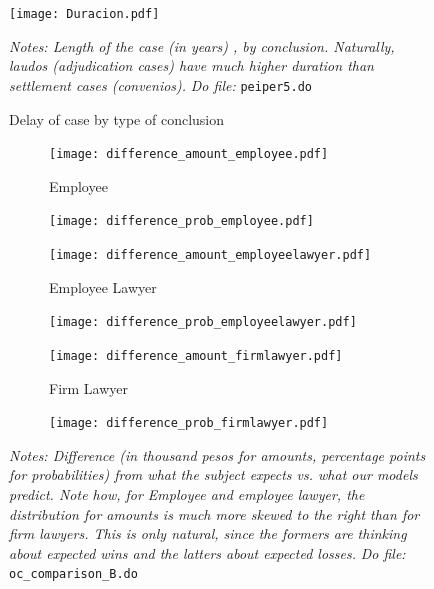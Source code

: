 \documentclass[11pt]{article}
\begin{document}
  
\begin{figure}[H]
    \caption{Delay of case by type of conclusion}
    \label{DurationFig}
    \begin{center}
        \texttt{[image: Duracion.pdf]}
        \end{center}
    {\footnotesize \textit{Notes: Length of the case (in years) , by conclusion. Naturally, laudos (adjudication cases) have much higher duration than settlement cases (convenios).}}
    {\footnotesize \textit{Do file: } \texttt{peiper5.do}}
\end{figure}



\begin{figure}[H]
    \caption{Difference in what actor says and calculator predicts in amount and probability.}
    \label{Figure_overconfidence_exp}
    \begin{center}
    \begin{subfigure}{0.49\textwidth}
        \caption{Employee}
        \centering
        \texttt{[image: difference\_amount\_employee.pdf]}
    \end{subfigure}
     \begin{subfigure}{0.49\textwidth}
        \centering
        \texttt{[image: difference\_prob\_employee.pdf]}
    \end{subfigure}
    \begin{subfigure}{0.49\textwidth}
        \caption{Employee Lawyer}
        \centering
        \texttt{[image: difference\_amount\_employeelawyer.pdf]}
        \end{subfigure}
          \begin{subfigure}{0.49\textwidth}
        \centering
        \texttt{[image: difference\_prob\_employeelawyer.pdf]}
    \end{subfigure}
        \begin{subfigure}{0.49\textwidth}
            \caption{Firm Lawyer}
            \centering
            \texttt{[image: difference\_amount\_firmlawyer.pdf]}
    \end{subfigure}
    \begin{subfigure}{0.49\textwidth}
            \centering
            \texttt{[image: difference\_prob\_firmlawyer.pdf]}
        \end{subfigure}
    \end{center}
     \footnotesize \textit{Notes: Difference (in thousand pesos for amounts, percentage points for probabilities) from what the subject expects vs. what our models predict. Note how, for Employee and employee lawyer, the distribution for amounts is much more skewed to the right than for firm lawyers. This is only natural, since the formers are thinking about expected wins and the latters about expected losses.} 
      \footnotesize{ \textit{Do file: }  \texttt{oc\_comparison\_B.do}}
\end{figure}
\end{document}
